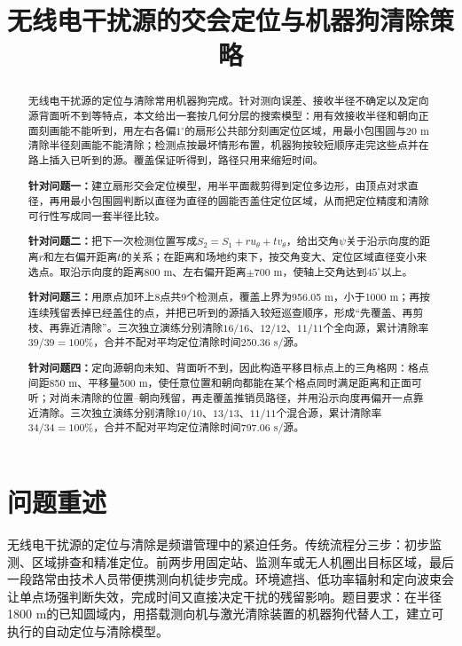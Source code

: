 \documentclass{cumcmthesis}
\title{无线电干扰源的交会定位与机器狗清除策略}
\begin{document}
\maketitle

\begin{abstract}
无线电干扰源的定位与清除常用机器狗完成。针对测向误差、接收半径不确定以及定向源背面听不到等特点，本文给出一套按几何分层的搜索模型：用有效接收半径和朝向正面刻画能不能听到，用左右各偏$1^\circ$的扇形公共部分刻画定位区域，用最小包围圆与20 m清除半径刻画能不能清除；检测点按最坏情形布置，机器狗按较短顺序走完这些点并在路上插入已听到的源。覆盖保证听得到，路径只用来缩短时间。

\textbf{针对问题一：}建立扇形交会定位模型，用半平面裁剪得到定位多边形，由顶点对求直径，再用最小包围圆判断以直径为直径的圆能否盖住定位区域，从而把定位精度和清除可行性写成同一套半径比较。

\textbf{针对问题二：}把下一次检测位置写成$S_2=S_1+r u_{\theta}+t v_{\theta}$，给出交角$\psi$关于沿示向度的距离$r$和左右偏开距离$t$的关系；在距离和场地约束下，按交角变大、定位区域直径变小来选点。取沿示向度的距离800 m、左右偏开距离$\pm 700$ m，使轴上交角达到$45^\circ$以上。

\textbf{针对问题三：}用原点加环上8点共9个检测点，覆盖上界为956.05 m，小于1000 m；再按连续残留丢掉已经盖住的点，并把已听到的源插入较短巡查顺序，形成“先覆盖、再剪枝、再靠近清除”。三次独立演练分别清除$16/16$、$12/12$、$11/11$个全向源，累计清除率$39/39=100\%$，合并不配对平均定位清除时间250.36 s/源。

\textbf{针对问题四：}定向源朝向未知、背面听不到，因此构造平移目标点上的三角格网：格点间距850 m、平移量500 m，使任意位置和朝向都能在某个格点同时满足距离和正面可听；对尚未清除的位置--朝向残留，再走覆盖推销员路径，并用沿示向度再偏开一点靠近清除。三次独立演练分别清除$10/10$、$13/13$、$11/11$个混合源，累计清除率$34/34=100\%$，合并不配对平均定位清除时间797.06 s/源。
\end{abstract}

\section{问题重述}

无线电干扰源的定位与清除是频谱管理中的紧迫任务。传统流程分三步：初步监测、区域排查和精准定位。前两步用固定站、监测车或无人机圈出目标区域，最后一段路常由技术人员带便携测向机徒步完成。环境遮挡、低功率辐射和定向波束会让单点场强判断失效，完成时间又直接决定干扰的残留影响。题目要求：在半径1800 m的已知圆域内，用搭载测向机与激光清除装置的机器狗代替人工，建立可执行的自动定位与清除模型。
\end{document}
